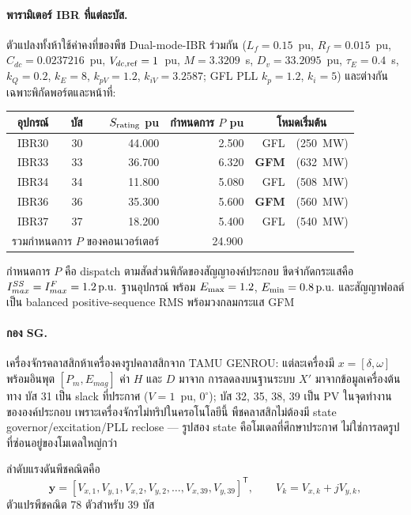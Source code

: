 \documentclass[12pt,a4paper]{article}
\newcommand{\vect}[1]{\boldsymbol{#1}}
\newcommand{\pu}{\ifmmode\,\mathrm{p.u.}\else\ p.u.\fi}
\begin{document}
\paragraph{พารามิเตอร์ IBR ที่แต่ละบัส.}
ตัวแปลงทั้งห้าใช้ค่าคงที่ของพืช Dual-mode-IBR ร่วมกัน ($L_f=0.15$~pu, $R_f=0.015$~pu,
$C_{dc}=0.0237216$~pu, $V_{dc,\rm ref}=1$~pu, $M=3.3209$~s,
$D_v=33.2095$~pu, $\tau_E=0.4$~s, $k_Q=0.2$, $k_E=8$, $k_{pV}=1.2$,
$k_{iV}=3.2587$; GFL PLL $k_p=1.2$, $k_i=5$) และต่างกันเฉพาะพิกัดพอร์ตและหน้าที่:
\begin{center}\footnotesize
\begin{tabular}{crrrrr}
\toprule
อุปกรณ์ & บัส & $S_{\rm rating}$ pu & กำหนดการ $P$ pu & \multicolumn{2}{c}{โหมดเริ่มต้น}\\
\midrule
IBR30 & 30 & 44.000 & 2.500 & GFL & (250~MW)\\
IBR33 & 33 & 36.700 & 6.320 & \textbf{GFM} & (632~MW)\\
IBR34 & 34 & 11.800 & 5.080 & GFL & (508~MW)\\
IBR36 & 36 & 35.300 & 5.600 & \textbf{GFM} & (560~MW)\\
IBR37 & 37 & 18.200 & 5.400 & GFL & (540~MW)\\
\midrule
\multicolumn{3}{r}{รวมกำหนดการ $P$ ของคอนเวอร์เตอร์} & \multicolumn{2}{c}{24.900}\\
\bottomrule
\end{tabular}
\end{center}
กำหนดการ $P$ คือ dispatch ตามสัดส่วนพิกัดของสัญญาองค์ประกอบ
ขีดจำกัดกระแสคือ $I_{max}^{SS}=I_{max}^{F}=1.2\pu$ ฐานอุปกรณ์
พร้อม $E_{\rm max}=1.2$, $E_{\rm min}=0.8\pu$ และสัญญาฟอลต์เป็น balanced
positive-sequence RMS พร้อมวงกลมกระแส GFM

\paragraph{กอง SG.}
เครื่องจักรคลาสสิกห้าเครื่องคงรูปคลาสสิกจาก TAMU GENROU: แต่ละเครื่องมี
$x=[\delta,\omega]$ พร้อมอินพุต $[P_m,E_{mag}]$ ค่า $H$ และ $D$ มาจาก
การลดลงบนฐานระบบ $X'$ มาจากข้อมูลเครื่องต้นทาง บัส 31 เป็น slack ที่ประกาศ
($V=1$~pu, $0^\circ$); บัส 32, 35, 38, 39 เป็น PV ในจุดทำงานขององค์ประกอบ
เพราะเครื่องจักรไม่ทริปในครอโนโลยีนี้ พืชคลาสสิกไม่ต้องมี state governor/excitation/PLL
reclose — รูปสอง state คือโมเดลที่ศึกษาประกาศ ไม่ใช่การลดรูปที่ซ่อนอยู่ของโมเดลใหญ่กว่า

ลำดับแรงดันพีชคณิตคือ
\[
\vect y=[V_{x,1},V_{y,1},V_{x,2},V_{y,2},\ldots,V_{x,39},V_{y,39}]^{\mathsf T},
\qquad V_k=V_{x,k}+jV_{y,k},
\]
ตัวแปรพีชคณิต 78 ตัวสำหรับ 39 บัส
\end{document}
